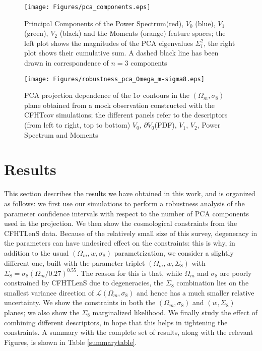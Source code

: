 \documentclass[reprint,aps,prd,superscriptaddress,showkeys,showpacs]{revtex4-1}
\begin{document}

%
\begin{figure*}
\texttt{[image: Figures/pca\_components.eps]}
\caption{Principal Components of the Power Spectrum(red), $V_0$ (blue), $V_1$ (green), $V_2$ (black) and the Moments (orange) feature spaces; the left plot shows the magnitudes of the PCA eigenvalues $\Sigma_i^2$, the right plot shows their cumulative sum. A dashed black line has been drawn in correspondence of $n=3$ components}
\label{pcafig}
\end{figure*}
%
\begin{figure*}
\texttt{[image: Figures/robustness\_pca\_Omega\_m-sigma8.eps]}
\caption{PCA projection dependence of the $1\sigma$ contours in the $(\Omega_m,\sigma_8)$ plane obtained from a mock observation constructed with the CFHTcov simulations; the different panels refer to the descriptors (from left to right, top to bottom) $V_0$, $\partial V_0$(PDF), $V_1$, $V_2$, Power Spectrum and Moments}
\label{robustnessfig}
\end{figure*}
%

\section{Results}
\label{results}
This section describes the results we have obtained in this work, and is organized as follows: we first use our simulations to perform a robustness analysis of the parameter confidence intervals with respect to the number of PCA components used in the projection. We then show the cosmological constraints from the CFHTLenS data. Because of the relatively small size of this survey, degeneracy in the parameters can have undesired effect on the constraints: this is why, in addition to the usual $(\Omega_m,w,\sigma_8)$ parametrization, we consider a slightly different one, built with the parameter triplet $(\Omega_m,w,\Sigma_8)$ with $\Sigma_8=\sigma_8(\Omega_m/0.27)^{0.55}$. The reason for this is that, while $\Omega_m$ and $\sigma_8$ are poorly constrained by CFHTLenS due to degeneracies, the $\Sigma_8$ combination lies on the smallest variance direction of $\mathcal{L}(\Omega_m,\sigma_8)$ and hence has a much smaller relative uncertainty. We show the constraints in both the $(\Omega_m,\sigma_8)$ and $(w,\Sigma_8)$ planes; we also show the $\Sigma_8$ marginalized likelihood. We finally study the effect of combining different descriptors, in hope that this helps in tightening the constraints. A summary with the complete set of results, along with the relevant Figures, is shown in Table \ref{summarytable}. 
\end{document}
